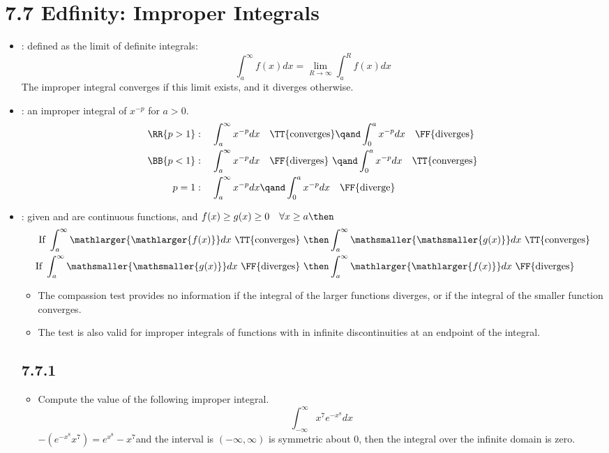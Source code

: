\section{7.7 Edfinity: Improper Integrals}
\begin{itemize}
  \item {}: defined as the limit of definite integrals:
  \[%
  \int_{a}^{\infty} f (x) dx = \lim_{R \to \infty}  \int_{a}^{R}  f (x) dx
  \]%
  The improper integral converges if this limit exists, and it diverges
  otherwise.
  \item {}: an improper integral of \(x^{-p}\) for \(a > 0\).
  \begin{align*}
    \RR{p > 1} &: \quad \int_{a}^{\infty} x^{-p} dx \quad \text{\TT{converges}} \qand \int_{0}^{a} x^{-p}dx \quad \text{\FF{diverges}}\\
    \BB{p < 1} &: \quad \int_{a}^{\infty} x^{-p} dx \quad \text{\FF{diverges}}~ \qand \int_{0}^{a} x^{-p}dx \quad \text{\TT{converges}}\\
    p = 1 &: \quad \int_{a}^{\infty} x^{-p} dx  \qand \int_{0}^{a} x^{-p}dx \quad \text{\FF{diverge}}
  \end{align*}
  \item {}: given  and  are
    continuous functions, and \(f (x) \geq g (x) \geq 0 \quad\forall x \geq a \then\)
    \begin{align*}
      \text{If}~\int_{a}^{\infty} \mathlarger{\mathlarger{f (x)}} dx ~\text{\TT{converges}}~&\then
      \int_{a}^{\infty} \mathsmaller{\mathsmaller{g (x)}} dx ~\text{\TT{converges}}\\
      \text{If}~\int_{a}^{\infty} \mathsmaller{\mathsmaller{g (x)}} dx ~\text{\FF{diverges}}~&\then
      \int_{a}^{\infty} \mathlarger{\mathlarger{f (x)}} dx ~\text{\FF{diverges}}
    \end{align*}
    \begin{itemize}
      \item The compassion test provides no information if the integral of the
        larger functions diverges, or if the integral of the smaller function
        converges.
      \item The test is also valid for improper integrals of functions with in
        infinite discontinuities at an endpoint of the integral.
    \end{itemize}

  \subsection{7.7.1}
  \begin{itemize}
    \item Compute the value of the following improper integral.
      \[%
      \int_{-\infty}^{\infty} x^7 e^{-x^8} dx
      \]%
      \(-(e^{-x^8}x^7) = e^{x^8}-x^7\)and the interval is \((-\infty,
      \infty)\) is symmetric about 0, then the integral over the infinite
      domain is zero.
  \end{itemize}


\end{itemize}
